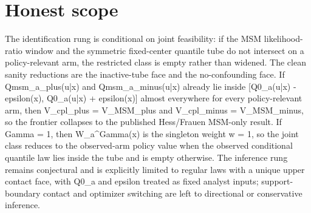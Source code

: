\documentclass{article}
\begin{document}
\section{Honest scope}

The identification rung is conditional on joint feasibility: if the MSM likelihood-ratio window and the symmetric fixed-center quantile tube do not intersect on a policy-relevant arm, the restricted class is empty rather than widened. The clean sanity reductions are the inactive-tube face and the no-confounding face. If Qmsm_a_plus(u|x) and Qmsm_a_minus(u|x) already lie inside [Q0_a(u|x) - epsilon(x), Q0_a(u|x) + epsilon(x)] almost everywhere for every policy-relevant arm, then V_cpl_plus = V_MSM_plus and V_cpl_minus = V_MSM_minus, so the frontier collapses to the published Hess/Frauen MSM-only result. If Gamma = 1, then W_a^Gamma(x) is the singleton weight w = 1, so the joint class reduces to the observed-arm policy value when the observed conditional quantile law lies inside the tube and is empty otherwise. The inference rung remains conjectural and is explicitly limited to regular laws with a unique upper contact face, with Q0_a and epsilon treated as fixed analyst inputs; support-boundary contact and optimizer switching are left to directional or conservative inference.
\end{document}
